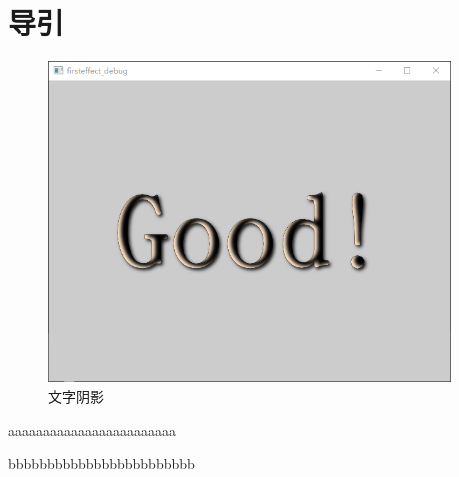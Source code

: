 ﻿




\FloatBarrier
\section{
导引
}\label{c000015s000001}


\begin{figure}[htb] %
\marginnote{\setlength\fboxsep{2pt}\fbox{\footnotesize{\kaishu\figurename\,}\footnotesize{\ref{p000012}}}}\centering %
\includegraphics[width=0.95\textwidth]{../chapter06/firsteffect/the_app.png} %
\caption{文字阴影} %
\label{p000012} %
\end{figure}


aaaaaaaaaaaaaaaaaaaaaaaa

bbbbbbbbbbbbbbbbbbbbbbbb









